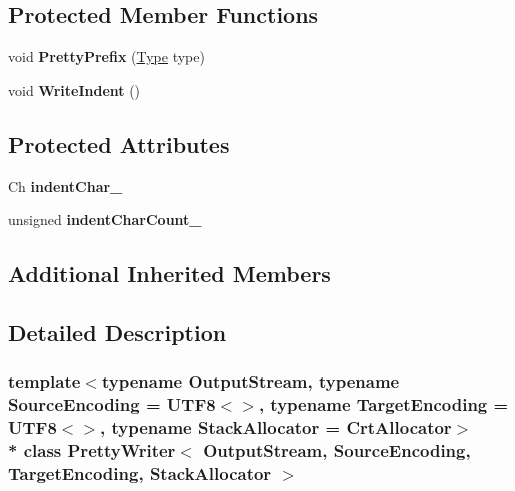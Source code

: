 \subsection*{Protected Member Functions}
\begin{DoxyCompactItemize}
\item 
void {\bfseries Pretty\+Prefix} (\hyperlink{rapidjson_8h_a1d1cfd8ffb84e947f82999c682b666a7}{Type} type)\hypertarget{class_pretty_writer_a7841433d45abbfc5a1799be0ca1ed792}{}\label{class_pretty_writer_a7841433d45abbfc5a1799be0ca1ed792}

\item 
void {\bfseries Write\+Indent} ()\hypertarget{class_pretty_writer_a649ec900d77960e085f76bb4d3c351d9}{}\label{class_pretty_writer_a649ec900d77960e085f76bb4d3c351d9}

\end{DoxyCompactItemize}
\subsection*{Protected Attributes}
\begin{DoxyCompactItemize}
\item 
Ch {\bfseries indent\+Char\+\_\+}\hypertarget{class_pretty_writer_a2cee1f24795fd6c56420df31d336c41d}{}\label{class_pretty_writer_a2cee1f24795fd6c56420df31d336c41d}

\item 
unsigned {\bfseries indent\+Char\+Count\+\_\+}\hypertarget{class_pretty_writer_ab2cffe9d93ce8a4890f927832f00d9f1}{}\label{class_pretty_writer_ab2cffe9d93ce8a4890f927832f00d9f1}

\end{DoxyCompactItemize}
\subsection*{Additional Inherited Members}


\subsection{Detailed Description}
\subsubsection*{template$<$typename Output\+Stream, typename Source\+Encoding = U\+T\+F8$<$$>$, typename Target\+Encoding = U\+T\+F8$<$$>$, typename Stack\+Allocator = Crt\+Allocator$>$\\*
class Pretty\+Writer$<$ Output\+Stream, Source\+Encoding, Target\+Encoding, Stack\+Allocator $>$}

